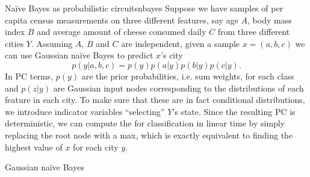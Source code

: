 \begin{example}[sidebyside,lefthand width=0.55\textwidth]{Naïve Bayes as probabilistic circuits}{nbayes}
  Suppose we have samples of per capita census measurements on three different features, say age
  $A$, body mass index $B$ and average amount of cheese consumed daily $C$ from three different
  cities $Y$.  Assuming $A$, $B$ and $C$ are independent, given a sample $x=(a,b,c)$ we can use
  Gaussian naïve Bayes to predict $x$'s city
  \begin{equation}
    p(y|a,b,c)=p(y)p(a|y)p(b|y)p(c|y).
  \end{equation}
  In PC terms, $p(y)$ are the prior probabilities, i.e. sum weights, for each class and $p(z|y)$
  are Gaussian input nodes corresponding to the distributions of each feature in each city. To make
  sure that these are in fact conditional distributions, we introduce indicator variables
  ``selecting'' $Y$'s state. Since the resulting PC is deterministic, we can compute the \map{} for
  classification in linear time by simply replacing the root node with a max, which is exactly
  equivalent to finding the highest value of $x$ for each city $y$.
  \tcblower
  \begin{center}

  \vskip -0.25cm
  \small%
  Gaussian naïve Bayes


\end{center}
\end{example}
